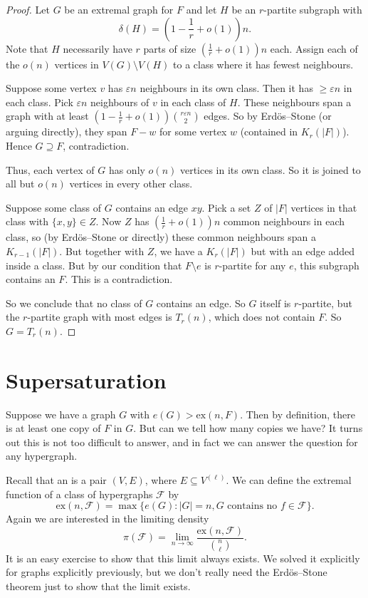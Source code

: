 \documentclass[a4paper]{article}
\renewcommand\ex{\mathrm{ex}}
\begin{document}
\begin{proof}
  Let $G$ be an extremal graph for $F$ and let $H$ be an $r$-partite subgraph with
  \[
    \delta(H) = \left(1 - \frac{1}{r} + o(1)\right)n.
  \]
  Note that $H$ necessarily have $r$ parts of size $\left(\frac{1}{r} + o(1)\right)n$ each. Assign each of the $o(n)$ vertices in $V(G) \setminus V(H)$ to a class where it has fewest neighbours.

  Suppose some vertex $v$ has $\varepsilon n$ neighbours in its own class. Then it has $\geq \varepsilon n$ in each class. Pick $\varepsilon n$ neighbours of $v$ in each class of $H$. These neighbours span a graph with at least $\left(1 -\frac{1}{r} + o(1)\right) \binom{r\varepsilon n}{2}$ edges. So by Erd\"os--Stone (or arguing directly), they span $F - w$ for some vertex $w$ (contained in $K_r(|F|)$). Hence $G \supseteq F$, contradiction.

  Thus, each vertex of $G$ has only $o(n)$ vertices in its own class. So it is joined to all but $o(n)$ vertices in every other class.

  Suppose some class of $G$ contains an edge $xy$. Pick a set $Z$ of $|F|$ vertices in that class with $\{x, y\} \in Z$. Now $Z$ has $\left(\frac{1}{r} + o(1)\right)n$ common neighbours in each class, so (by Erd\"os--Stone or directly) these common neighbours span a $K_{r - 1}(|F|)$. But together with $Z$, we have a $K_r(|F|)$ but with an edge added inside a class. But by our condition that $F \setminus e$ is $r$-partite for any $e$, this subgraph contains an $F$. This is a contradiction.

  So we conclude that no class of $G$ contains an edge. So $G$ itself is $r$-partite, but the $r$-partite graph with most edges is $T_r(n)$, which does not contain $F$. So $G = T_r(n)$.
\end{proof}

\section{Supersaturation}
Suppose we have a graph $G$ with $e(G) > \ex(n, F)$. Then by definition, there is at least one copy of $F$ in $G$. But can we tell how many copies we have? It turns out this is not too difficult to answer, and in fact we can answer the question for any hypergraph.

Recall that an  is a pair $(V, E)$, where $E \subseteq V^{(\ell)}$. We can define the extremal function of a class of hypergraphs $\mathcal{F}$ by
\[
  \ex(n, \mathcal{F}) = \max \{e(G): |G| = n, \text{$G$ contains no $f \in \mathcal{F}$}\}.
\]
Again we are interested in the limiting density
\[
  \pi(\mathcal{F}) = \lim_{n \to \infty} \frac{\ex(n, \mathcal{F})}{\binom{n}{\ell}}.
\]
It is an easy exercise to show that this limit always exists. We solved it explicitly for graphs explicitly previously, but we don't really need the Erd\"os--Stone theorem just to show that the limit exists.
\end{document}
